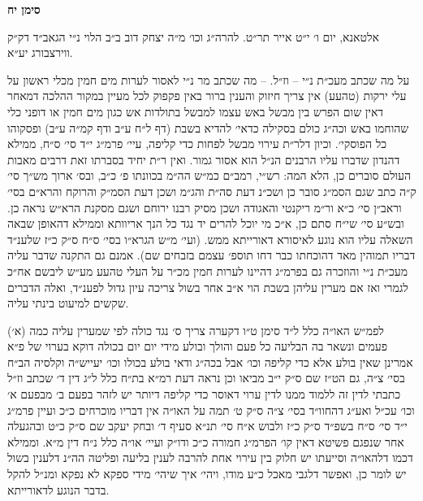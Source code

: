 \documentclass[12pt, openany]{book}
\newcommand{\chapname}{}
\newcommand{\newchap}[1]{
	\addcontentsline{toc}{chapter}{#1}
	\renewcommand{\chapname}{#1}
		\begin{center}
			\textbf{%
\fontsize{16pt}{16pt}\selectfont
				#1}
		\end{center}
}
\begin{document}
\newchap{סימן יח}
\begin{multicols}{2}
אלטאנא, יום ו׳ י״ט אייר תר״ט. להרה״ג וכו׳ מ״ה יצחק דוב ב״ב הלוי נ״י הגאב״ד דק״ק ווירצבורג יע״א.\\\vspace{0pt}

על מה שכתב מעכ״ת נ״י – וז״ל. – מה שכתב מר נ״י לאסור לערות מים חמין מכלי ראשון על עלי ירקות (טהעע) אין צריך חיזוק והענין ברור באין פקפוק לכל מעיין במקור ההלכה דמאחר דאין שום הפרש בין מבשל באש עצמו למבשל בתולדות אש כגון מים חמין או דופני כלי שהוחמו באש וכה״ג כולם בסקילה כדאי׳ להדיא בשבת (דף ל״ח ע״ב ודף קמ״ה ע״ב) ופסקוהו כל הפוסקי׳. וכיון דלר״ת עירוי מבשל לפחות כדי קליפה, עיי׳ פרמ״ג י״ד סי׳ ס״ח, ממילא דהנדון שדברו עליו הרבנים הנ״ל הוא אסור גמור. ואין ר״ת יחיד בסברתו זאת דרבים מאבות העולם סוברים כן, הלא המה: רש״י, רמב״ם כמ״ש הה״מ בכוונתו פ׳ כ״ב, ובס׳ ארוך מש״ך סי׳ ק״ה כתב שגם הסמ״ג סובר כן ושכ״נ דעת סה״ת והג״מ ושכן דעת הסמ״ק והרוקח והרא״ם בסי׳ וראב״ן סי׳ כ״א ור״מ ריקנטי והאגודה ושכן מסיק רבנו ירוחם ושגם מסקנת הרא״ש נראה כן. ובש״ע סי׳ שי״ח סתם כן, א״כ מי יוכל להרים יד נגד כל הנך אריוותא וממילא דהאופן שבאה השאלה עליו הוא נוגע לאיסורא דאורייתא ממש. (ועי׳ מ״ש הגרא״ו בסי׳ ס״ח ס״ק כ״ז שלענ״ד דבריו תמוהין מאד דהוכחתו כבר דחו תוספ׳ עצמם בזבחים שם). אמנם גם התקנה שדבר עליה מעכ״ת נ״י והוזכרה גם בפרמ״ג דהיינו לערות חמין מכ״ר על העלי טהעע מע״ש ליבשם אח״כ לגמרי ואז אם מערין עליהן בשבת הוי א״ב אחר בשול צריכה עיון גדול לפענ״ד, ואלה הדברים שקשים למיעוט בינתי עליה.\\\vspace{0pt}

(א׳) לפמ״ש האו״ה כלל ל״ד סימן ט״ו דקערה צריך ס׳ נגד כולה לפי שמערין עליה כמה פעמים ונשאר בה הבליעה כל פעם והולך ובולע מידי יום יום בכולה דוקא בערוי של פ״א אמרינן שאין בולע אלא כדי קליפה וכו׳ אבל בכה״ג ודאי בולע בכולו וכו׳ יעייש״ה וקלסיה הב״ח בסי׳ צ״ה, גם הט״ז שם ס״ק י״ב מביאו וכן נראה דעת רמ״א בת״ח כלל ל״ג דין ד׳ שכתב וז״ל כתבתי לדין זה ללמוד ממנו לדין ערוי דאוסר כדי קליפה דיותר יש לזהר בפעם ב׳ מבפעם א׳ וכו׳ עכ״ל ואע״ג דהחוו״ד בסי׳ צ״ה ס״ק ט׳ תמה על האו״ה אין דבריו מוכרחים כ״כ ועיין פרמ״ג י״ד סי׳ ס״ח בשפ״ד ס״ק כ״ז ולבוש א״ח סי׳ תנ״א סעיף ד׳ ובחק יעקב שם ס״ק כ״ט ובהגעלה אחר שנפגם פשיטא דאין קו׳ הפרמ״ג חמורה כ״כ ודו״ק ועיי׳ או״ה כלל נ״ח דין מ״א. וממילא דכמו דלהאו״ה וסייעתו יש חלוק בין עירוי אחת להרבה לענין בליעה ופליטה הה״נ דלענין בשול יש לומר כן, ואפשר דלגבי מאכל כ״ע מודו, ויהי׳ איך שיהי׳ מידי ספקא לא נפקא ומנ״ל להקל בדבר הנוגע לדאורייתא.\\\vspace{0pt}


\end{multicols}
\end{document}
